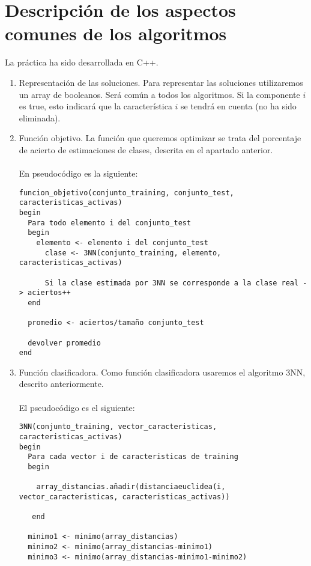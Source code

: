 	\newpage
	
	
	\section{Descripción de los aspectos comunes de los algoritmos}
	La práctica ha sido desarrollada en C++.
	\\
	
	\begin{enumerate}
		\item Representación de las soluciones. Para representar las soluciones utilizaremos un array de booleanos. Será común a todos los algoritmos. Si la componente $i$ es true, esto indicará que la característica $i$ se tendrá en cuenta (no ha sido eliminada).
		
		\item Función objetivo. La función que queremos optimizar se trata del porcentaje de acierto de estimaciones de clases, descrita en el apartado anterior.
		\\
		\\
		En pseudocódigo es la siguiente:
		\begin{lstlisting}
funcion_objetivo(conjunto_training, conjunto_test, caracteristicas_activas)
begin
  Para todo elemento i del conjunto_test
  begin
    elemento <- elemento i del conjunto_test
	  clase <- 3NN(conjunto_training, elemento, caracteristicas_activas)
				
	  Si la clase estimada por 3NN se corresponde a la clase real -> aciertos++
  end
			
  promedio <- aciertos/tamaño conjunto_test
			
  devolver promedio
end
		\end{lstlisting}
		
		\item Función clasificadora. Como función clasificadora usaremos el algoritmo 3NN, descrito anteriormente.
		\\
		\\
		El pseudocódigo es el siguiente:
		\begin{lstlisting}
3NN(conjunto_training, vector_caracteristicas, caracteristicas_activas)
begin
  Para cada vector i de caracteristicas de training
  begin
  
    array_distancias.añadir(distanciaeuclidea(i, vector_caracteristicas, caracteristicas_activas))
    
   end
   
  minimo1 <- minimo(array_distancias)
  minimo2 <- minimo(array_distancias-minimo1)
  minimo3 <- minimo(array_distancias-minimo1-minimo2)
  

\end{lstlisting}
\end{enumerate}
